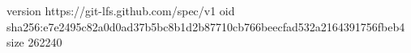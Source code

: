 version https://git-lfs.github.com/spec/v1
oid sha256:e7e2495c82a0d0ad37b5bc8b1d2b87710cb766beecfad532a2164391756fbeb4
size 262240
